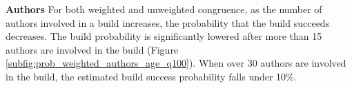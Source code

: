 \documentclass[12pt,oneside]{book}
\begin{document}
\indent\indent
\textbf{Authors} For both weighted and unweighted congruence, as the number of authors involved in a build increases, the probability that the build succeeds decreases. The build probability is significantly lowered after more than 15 authors are involved in the build (Figure \ref{subfig:prob_weighted_authors_age_q100}). When over 30 authors are involved in the build, the estimated build success probability falls under 10\%.

\begin{figure}[b]
\centering
{}


\end{figure}
\end{document}
